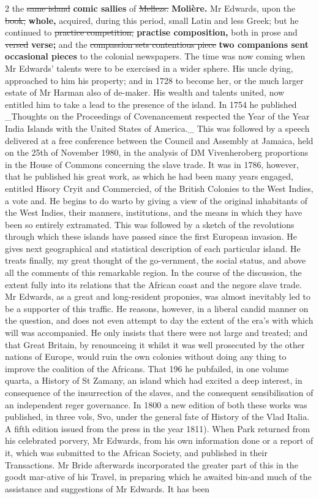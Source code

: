 \documentclass[10pt]{article}
\begin{document}
\begin{multicols}{2}
the \sout{same island} \textbf{comic sallies} of \sout{Mellezs.} \textbf{Molière.} Mr Edwards, upon the \sout{book,} \textbf{whole,} acquired, during this period, small Latin and less Greek; but he continued to \sout{practice competition,} \textbf{practise composition,} both in prose and \sout{versed} \textbf{verse;} and the \sout{compassion sets contentious piece} \textbf{two companions sent occasional pieces} to the colonial newspapers. The time was now coming when Mr Edwards’ talents were to be exercised in a wider sphere. His uncle dying, approached to him his property; and in 1728 to become her, or the much larger estate of Mr Harman also of de-maker. His wealth and talents united, now entitled him to take a lead to the presence of the island. In 1754 he published \_Thoughts on the Proceedings of Covenancement respected the Year of the Year India Islands with the United States of America.\_ This was followed by a speech delivered at a free conference between the Council and Assembly at Jamaica, held on the 25th of November 1980, in the analysis of DM Vivenheroberg proportions in the House of Commons concerning the slave trade. It was in 1786, however, that he published his great work, as which he had been many years engaged, entitled Hisory Cryit and Commercied, of the British Colonies to the West Indies, a vote and. He begins to do warto by giving a view of the original inhabitants of the West Indies, their manners, institutions, and the means in which they have been so entirely extramated. This was followed by a sketch of the revolutions through which these islands have passed since the first European invasion. He gives next geographical and statistical description of each particular island. He treats finally, my great thought of the go-vernment, the social status, and above all the comments of this remarkable region. In the course of the discussion, the extent fully into its relations that the African coast and the negore slave trade. Mr Edwards, as a great and long-resident proponies, was almost inevitably led to be a supporter of this traffic. He reasons, however, in a liberal candid manner on the question, and does not even attempt to day the extent of the era's with which will was accompanied. He only insists that there were not large and treated; and that Great Britain, by renounceing it whilst it was well prosecuted by the other nations of Europe, would ruin the own colonies without doing any thing to improve the coalition of the Africans. That 196 he pub­failed, in one volume quarta, a History of St Zamany, an island which had excited a deep interest, in consequence of the insurrection of the slaves, and the consequent sensibilisation of an independent reger governance. In 1800 a new edition of both these works was published, in three vols, Svo, under the general fate of History of the Vlad Italia. A fifth edition issued from the press in the year 1811). When Park returned from his celebrated porvery, Mr Edwards, from his own information done or a report of it, which was submitted to the African Society, and published in their Transactions. Mr Bride afterwards incorporated the greater part of this in the goodt mar-ative of his Travel, in preparing which he awaited bin-and much of the assistance and suggestions of Mr Edwards. It has been 
\end{multicols}
\end{document}
